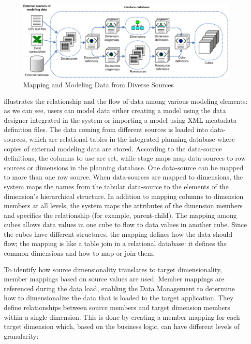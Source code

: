 \documentclass[12pt,a4paper,openright,twoside]{book}
\begin{document}
\begin{figure}[htbp]
	\centering
	\includegraphics[width=\linewidth]{figures/data-mapping.pdf}
	\caption{Mapping and Modeling Data from Diverse Sources}
	\label{fig:mapping}
\end{figure}

 illustrates the relationship and the flow of data among various modeling elements:
%
as we can see, users can model data either creating a model using the data designer integrated in the system or importing a model using XML meatadata definition files.
%
The data coming from different sources is loaded into data-sources, which are relational tables in the integrated planning database where copies of external modeling data are stored. 
%
According to the data-source definitions, the columns to use are set, while stage maps map data-sources to row sources or dimensions in the planning database. 
%
One data-source can be mapped to more than one row source.
%
When data-sources are mapped to dimensions, the system maps the names from the tabular data-source to the elements of the dimension’s hierarchical structure. 
%
In addition to mapping columns to dimension members at all levels, the system maps the attributes of the dimension members and specifies the relationship (for example, parent-child).
%
The mapping among cubes allows data values in one cube to flow to data values in another cube. 
%
Since the cubes have different structures, the mapping defines how the data should flow; the mapping is like a table join in a relational database: it defines the common dimensions and how to map or join them.

To identify how source dimensionality translates to target dimensionality, member mappings based on source values are used. 
%
Member mappings are referenced during the data load, enabling the Data Management to determine how to dimensionalize the data that is loaded to the target application. 
%
They define relationships between source members and target dimension members within a single dimension. 
%
This is done by creating a member mapping for each target dimension which, based on the business logic, can have different levels of granularity:
\end{document}
